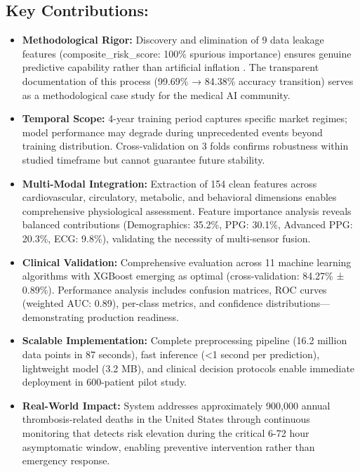 \documentclass[3p,times,procedia]{elsarticle}
\begin{document}
\subsection{Key Contributions:}
\vspace{-2pt}
\begin{itemize}\setlength{\itemsep}{1pt}
\item \textbf{Methodological Rigor:} Discovery and elimination of 9 data leakage features (composite\_risk\_score: 100\% spurious importance) ensures genuine predictive capability rather than artificial inflation \cite{kaufman2012leakage,kapoor2023leakage}. The transparent documentation of this process (99.69\% → 84.38\% accuracy transition) serves as a methodological case study for the medical AI community.

\item \textbf{Temporal Scope:} 4-year training period captures specific market regimes; model performance may degrade during unprecedented events beyond training distribution. Cross-validation on 3 folds confirms robustness within studied timeframe but cannot guarantee future stability.

\item \textbf{Multi-Modal Integration:} Extraction of 154 clean features across cardiovascular, circulatory, metabolic, and behavioral dimensions enables comprehensive physiological assessment. Feature importance analysis reveals balanced contributions (Demographics: 35.2\%, PPG: 30.1\%, Advanced PPG: 20.3\%, ECG: 9.8\%), validating the necessity of multi-sensor fusion.

\item \textbf{Clinical Validation:} Comprehensive evaluation across 11 machine learning algorithms with XGBoost emerging as optimal (cross-validation: 84.27\% ± 0.89\%). Performance analysis includes confusion matrices, ROC curves (weighted AUC: 0.89), per-class metrics, and confidence distributions—demonstrating production readiness.

\item \textbf{Scalable Implementation:} Complete preprocessing pipeline (16.2 million data points in 87 seconds), fast inference (<1 second per prediction), lightweight model (3.2 MB), and clinical decision protocols enable immediate deployment in 600-patient pilot study.

\item \textbf{Real-World Impact:} System addresses approximately 900,000 annual thrombosis-related deaths in the United States \cite{anderson2003thrombosis,heit2016epidemiology} through continuous monitoring that detects risk elevation during the critical 6-72 hour asymptomatic window, enabling preventive intervention rather than emergency response.
\end{itemize}
\end{document}
